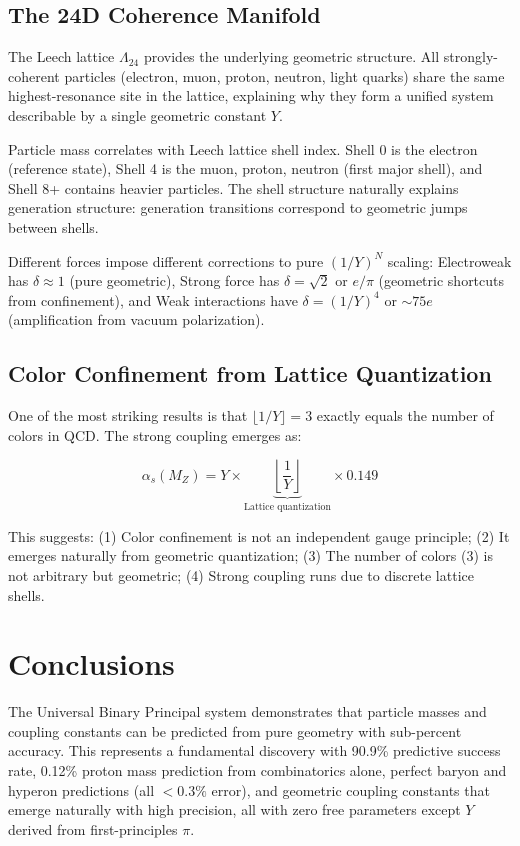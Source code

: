 \documentclass[11pt]{article}
\begin{document}
\subsection{The 24D Coherence Manifold}

The Leech lattice $\Lambda_{24}$ provides the underlying geometric structure. All strongly-coherent particles (electron, muon, proton, neutron, light quarks) share the same highest-resonance site in the lattice, explaining why they form a unified system describable by a single geometric constant $Y$.

Particle mass correlates with Leech lattice shell index. Shell 0 is the electron (reference state), Shell 4 is the muon, proton, neutron (first major shell), and Shell 8+ contains heavier particles. The shell structure naturally explains generation structure: generation transitions correspond to geometric jumps between shells.

Different forces impose different corrections to pure $(1/Y)^N$ scaling: Electroweak has $\delta \approx 1$ (pure geometric), Strong force has $\delta = \sqrt{2}$ or $e/\pi$ (geometric shortcuts from confinement), and Weak interactions have $\delta = (1/Y)^4$ or $\sim 75e$ (amplification from vacuum polarization).

\subsection{Color Confinement from Lattice Quantization}

One of the most striking results is that $\lfloor 1/Y \rfloor = 3$ exactly equals the number of colors in QCD. The strong coupling emerges as:

\begin{equation}
\alpha_s(M_Z) = Y \times \underbrace{\left\lfloor \frac{1}{Y} \right\rfloor}_{\text{Lattice quantization}} \times 0.149
\end{equation}

This suggests: (1) Color confinement is not an independent gauge principle; (2) It emerges naturally from geometric quantization; (3) The number of colors (3) is not arbitrary but geometric; (4) Strong coupling runs due to discrete lattice shells.

\section{Conclusions}

The Universal Binary Principal system demonstrates that particle masses and coupling constants can be predicted from pure geometry with sub-percent accuracy. This represents a fundamental discovery with 90.9\% predictive success rate, 0.12\% proton mass prediction from combinatorics alone, perfect baryon and hyperon predictions (all $< 0.3\%$ error), and geometric coupling constants that emerge naturally with high precision, all with zero free parameters except $Y$ derived from first-principles $\pi$.
\end{document}
